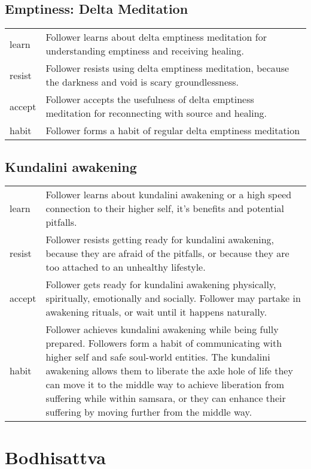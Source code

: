 \chapter{Emptiness: Delta Meditation}\label{chapter7}
\begin{tabular}{lp{}}
learn & Follower learns about delta emptiness meditation for understanding
emptiness and receiving healing.\\
resist & Follower resists using delta emptiness meditation, because the
darkness and void is scary groundlessness.\\
accept & Follower accepts the usefulness of delta emptiness
meditation for reconnecting with source and healing.\\
habit & Follower forms a habit of regular delta emptiness
meditation\\
\end{tabular}


\chapter{Kundalini awakening}

\begin{tabular}{lp{}}
learn & Follower learns about kundalini awakening or a high speed
connection to their higher self, it's benefits and potential pitfalls.\\
resist & Follower resists getting ready for kundalini awakening, 
because they are afraid of the pitfalls, 
or because they are too attached to an unhealthy lifestyle.\\
accept & Follower gets ready for kundalini awakening physically, 
spiritually, emotionally and socially. Follower may partake in awakening
rituals, or wait until it happens naturally.\\
habit & Follower achieves kundalini awakening while being fully prepared.
Followers form a habit of communicating with higher self and safe soul-world
entities. The kundalini awakening allows them to liberate the axle hole of life
 they can move it to the middle way to achieve liberation 
from suffering while within samsara, or they can enhance their suffering by
moving further from the middle way.\\
\end{tabular}


\part{Bodhisattva}
